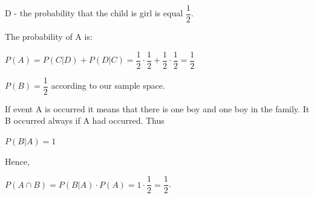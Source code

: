 \documentclass[12pt]{article}
\theoremstyle{definiton}
\theoremstyle{definition}
\theoremstyle{definition}
\begin{document}
		D - the probability that the child is girl is equal $\dfrac{1}{2}$.
		
		The probability of A is:
		
		$P\left(A\right) = P\left(C|D\right) + P\left(D|C\right)= \dfrac{1}{2}\cdot\dfrac{1}{2} + \dfrac{1}{2}\cdot\dfrac{1}{2} = \dfrac{1}{2}$
		
			
		$P\left(B\right) = \dfrac{1}{2}$ according to our sample space.
		
		If event A is occurred it means that there is one boy and one boy in the family. It B occurred always if A had occurred. Thus
		
		$P\left(B|A\right) = 1$
		
		Hence, 
		
		$P(A\cap B) = P\left(B|A\right)\cdot P \left(A\right) = 1 \cdot \dfrac{1}{2}=\dfrac{1}{2}$.
		
\end{document}
